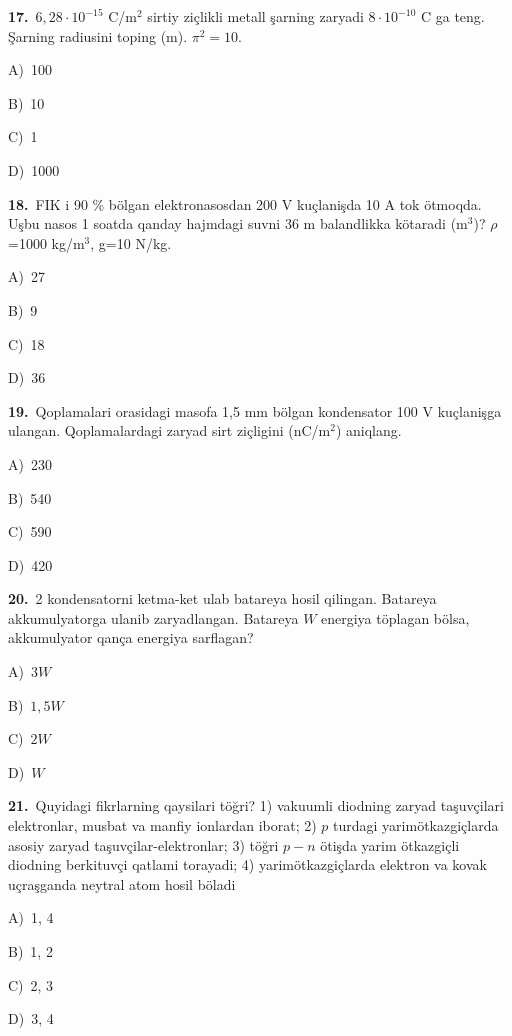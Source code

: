 \documentclass[11pt,a4paper]{article}
\newcommand{\opt}[2]{\hspace*{4mm}#1)\ #2\par}
\begin{document}
\noindent\begin{minipage}{\linewidth}
\textbf{17.}\ $6{,}28\cdot10^{-15}$ C/m$^{2}$ sirtiy ziçlikli metall şarning zaryadi $8\cdot10^{-10}$ C ga teng. Şarning radiusini toping (m). $\pi^2=10$.\par\smallskip
\opt{A}{100}
\opt{B}{10}
\opt{C}{1}
\opt{D}{1000}
\end{minipage}\vspace{9pt}\par
\noindent\begin{minipage}{\linewidth}
\textbf{18.}\ FIK i 90 \% bölgan elektronasosdan 200 V kuçlanişda 10 A tok ötmoqda. Uşbu nasos 1 soatda qanday hajmdagi suvni 36 m balandlikka kötaradi (m$^{3}$)? $\rho$=1000 kg/m$^{3}$, g=10 N/kg.\par\smallskip
\opt{A}{27}
\opt{B}{9}
\opt{C}{18}
\opt{D}{36}
\end{minipage}\vspace{9pt}\par
\noindent\begin{minipage}{\linewidth}
\textbf{19.}\ Qoplamalari orasidagi masofa 1,5 mm bölgan kondensator 100 V kuçlanişga ulangan. Qoplamalardagi zaryad sirt ziçligini (nC/m$^{2}$) aniqlang.\par\smallskip
\opt{A}{230}
\opt{B}{540}
\opt{C}{590}
\opt{D}{420}
\end{minipage}\vspace{9pt}\par
\noindent\begin{minipage}{\linewidth}
\textbf{20.}\ 2 kondensatorni ketma-ket ulab batareya hosil qilingan. Batareya akkumulyatorga ulanib zaryadlangan. Batareya $W$ energiya töplagan bölsa, akkumulyator qança energiya sarflagan?\par\smallskip
\opt{A}{$3W$}
\opt{B}{$1{,}5W$}
\opt{C}{$2W$}
\opt{D}{$W$}
\end{minipage}\vspace{9pt}\par
\noindent\begin{minipage}{\linewidth}
\textbf{21.}\ Quyidagi fikrlarning qaysilari töğri? 1) vakuumli diodning zaryad taşuvçilari elektronlar, musbat va manfiy ionlardan iborat; 2) $p$ turdagi yarimötkazgiçlarda asosiy zaryad taşuvçilar-elektronlar; 3) töğri $p-n$ ötişda yarim ötkazgiçli diodning berkituvçi qatlami torayadi; 4) yarimötkazgiçlarda elektron va kovak uçraşganda neytral atom hosil böladi\par\smallskip
\opt{A}{1, 4}
\opt{B}{1, 2}
\opt{C}{2, 3}
\opt{D}{3, 4}
\end{minipage}\vspace{9pt}\par
\end{document}
